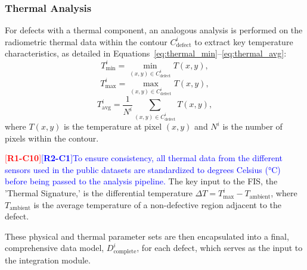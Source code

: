 \documentclass[energies,article,submit,pdftex,moreauthors]{Definitions/mdpi}
\newcommand{\revtag}[2]{[\textbf{R#1-C#2}]}
\newcommand{\Rone}[1]{\textcolor{red}{#1}}
\newcommand{\Rtwo}[1]{\textcolor{blue}{#1}}
\begin{document}
\subsubsection{Thermal Analysis}
For defects with a thermal component, an analogous analysis is performed on the radiometric thermal data within the contour \(C^i_{\text{defect}}\) to extract key temperature characteristics, as detailed in Equations~\ref{eq:thermal_min}–\ref{eq:thermal_avg}:
\begin{equation}
    T^i_{\min} = \min_{(x,y) \in C^i_{\text{defect}}} T(x,y),
    \label{eq:thermal_min}
\end{equation}
\begin{equation}
    T^i_{\max} = \max_{(x,y) \in C^i_{\text{defect}}} T(x,y),
    \label{eq:thermal_max}
\end{equation}
\begin{equation}
    T^i_{\text{avg}} = \frac{1}{N^i} \sum_{(x,y) \in C^i_{\text{defect}}} T(x,y),
    \label{eq:thermal_avg}
\end{equation}
where \(T(x,y)\) is the temperature at pixel \((x,y)\) and \(N^i\) is the number of pixels within the contour.

\Rone{\revtag{1}{10}}\Rtwo{\revtag{2}{1}To ensure consistency, all thermal data from the different sensors used in the public datasets are standardized to degrees Celsius (\si{\celsius}) before being passed to the analysis pipeline.} The key input to the FIS, the 'Thermal Signature,' is the differential temperature \(\Delta T = T^i_{\max} - T_{\text{ambient}}\), where \(T_{\text{ambient}}\) is the average temperature of a non-defective region adjacent to the defect.

These physical and thermal parameter sets are then encapsulated into a final, comprehensive data model, \(D^i_{\text{complete}}\), for each defect, which serves as the input to the integration module.
\end{document}
